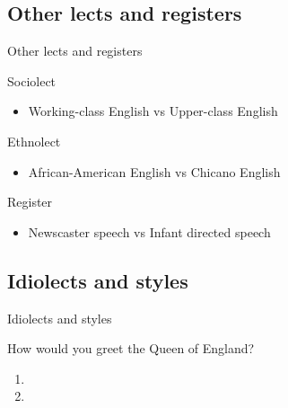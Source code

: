 \documentclass{beamer}
\newcommand{\subtwothree}{Other lects and registers}
\newcommand{\subtwofour}{Idiolects and styles}
\begin{document}
    \subsection{\subtwothree}
      \begin{frame}{\subtwothree}
        \begin{alertblock}{Sociolect}
          
          \begin{itemize}
            \item Working-class English vs Upper-class English
          \end{itemize}
        \end{alertblock}
        \begin{alertblock}{Ethnolect}
          
          \begin{itemize}
            \item African-American English vs Chicano English
          \end{itemize}
        \end{alertblock}
        \begin{alertblock}{Register}
          
          \begin{itemize}
            \item Newscaster speech vs Infant directed speech
          \end{itemize}
        \end{alertblock}
      \end{frame}

    \subsection{\subtwofour}
      \begin{frame}{\subtwofour}
        \begin{block}{How would you greet the Queen of England?}
          \begin{enumerate}
            \item {}
            \item {}
          \end{enumerate}
        \end{block}
      \end{frame}
\end{document}
